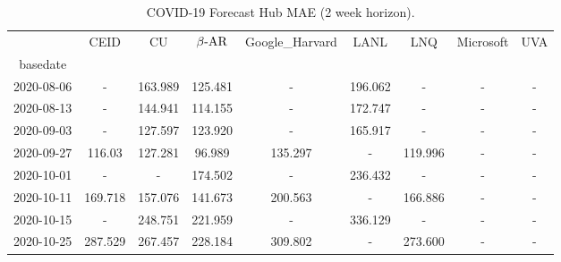     
\begin{table*}[t]
\small
\caption{COVID-19 Forecast Hub MAE (2 week horizon).\label{tab:reichalb_eval_2} }

\centering
    
\begin{tabular}{ccccccccc}
\toprule
{} &     CEID &                             CU &                         $\beta\text{-AR}$ &                Google\_Harvard &     LANL &      LNQ &                      Microsoft &      UVA \\
basedate   &          &                                &                                &                                &          &          &                                &          \\
\midrule
2020-08-06 &        - &                        163.989 &  {\cellcolor{blue!25} 125.481} &                              - &  196.062 &        - &                              - &        - \\
2020-08-13 &        - &                        144.941 &  {\cellcolor{blue!25} 114.155} &                              - &  172.747 &        - &                              - &        - \\
2020-09-03 &        - &                        127.597 &  {\cellcolor{blue!25} 123.920} &                              - &  165.917 &        - &                              - &        - \\
2020-09-27 &   116.03 &                        127.281 &   {\cellcolor{blue!25} 96.989} &                        135.297 &        - &  119.996 &                              - &        - \\
2020-10-01 &        - &                              - &  {\cellcolor{blue!25} 174.502} &                              - &  236.432 &        - &                              - &        - \\
2020-10-11 &  169.718 &                        157.076 &  {\cellcolor{blue!25} 141.673} &                        200.563 &        - &  166.886 &                              - &        - \\
2020-10-15 &        - &                        248.751 &  {\cellcolor{blue!25} 221.959} &                              - &  336.129 &        - &                              - &        - \\
2020-10-25 &  287.529 &                        267.457 &  {\cellcolor{blue!25} 228.184} &                        309.802 &        - &  273.600 &                              - &        - \\

\end{tabular}
\end{table*}
